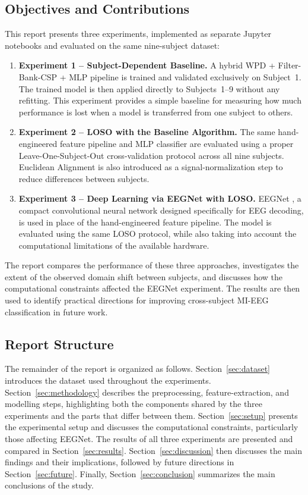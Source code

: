 \documentclass[11pt,a4paper]{article}
\begin{document}
	\subsection{Objectives and Contributions}
	
	This report presents three experiments, implemented as separate Jupyter notebooks and
	evaluated on the same nine-subject dataset:
	
	\begin{enumerate}[leftmargin=1.2cm]
		\item \textbf{Experiment 1 -- Subject-Dependent Baseline.}
		A hybrid WPD + Filter-Bank-CSP + MLP pipeline is trained and validated exclusively on
		Subject~1. The trained model is then applied directly to Subjects~1--9 without any
		refitting. This experiment provides a simple baseline for measuring how much performance
		is lost when a model is transferred from one subject to others.
		
		\item \textbf{Experiment 2 -- LOSO with the Baseline Algorithm.}
		The same hand-engineered feature pipeline and MLP classifier are evaluated using a proper
		Leave-One-Subject-Out cross-validation protocol across all nine subjects. Euclidean
		Alignment is also introduced as a signal-normalization step to reduce differences
		between subjects.
		
		\item \textbf{Experiment 3 -- Deep Learning via EEGNet with LOSO.}
		EEGNet \cite{lawhern2018eegnet}, a compact convolutional neural network designed
		specifically for EEG decoding, is used in place of the hand-engineered feature pipeline.
		The model is evaluated using the same LOSO protocol, while also taking into account the
		computational limitations of the available hardware.
	\end{enumerate}
	
	The report compares the performance of these three approaches, investigates the extent of
	the observed domain shift between subjects, and discusses how the computational constraints
	affected the EEGNet experiment. The results are then used to identify practical directions
	for improving cross-subject MI-EEG classification in future work.
	\subsection{Report Structure}
	
	The remainder of the report is organized as follows. Section~\ref{sec:dataset} introduces the
	dataset used throughout the experiments. Section~\ref{sec:methodology} describes the preprocessing,
	feature-extraction, and modelling steps, highlighting both the components shared by the three
	experiments and the parts that differ between them. Section~\ref{sec:setup} presents the experimental
	setup and discusses the computational constraints, particularly those affecting EEGNet. The results
	of all three experiments are presented and compared in Section~\ref{sec:results}. Section~\ref{sec:discussion}
	then discusses the main findings and their implications, followed by future directions in
	Section~\ref{sec:future}. Finally, Section~\ref{sec:conclusion} summarizes the main conclusions of the study.
	
\end{document}

